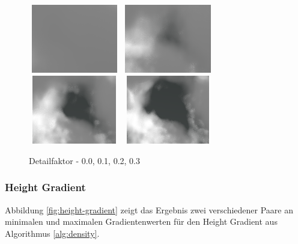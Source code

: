 \begin{figure}[H]
    \centering
    \includegraphics[width=4cm, height=3cm]{figures/detail-factor/detail-factor-0.0.png}
    \includegraphics[width=4cm, height=3cm]{figures/detail-factor/detail-factor-0.1.png}
    \includegraphics[width=4cm, height=3cm]{figures/detail-factor/detail-factor-0.2.png}
    \includegraphics[width=4cm, height=3cm]{figures/detail-factor/detail-factor-0.3.png}
    \caption{Detailfaktor - 0.0, 0.1, 0.2, 0.3}
    \label{fig:detail-factor}
\end{figure}

\subsubsection{Height Gradient}
Abbildung \ref{fig:height-gradient} zeigt das Ergebnis zwei verschiedener Paare an minimalen und maximalen Gradientenwerten für den Height Gradient aus Algorithmus \ref{alg:density}.

